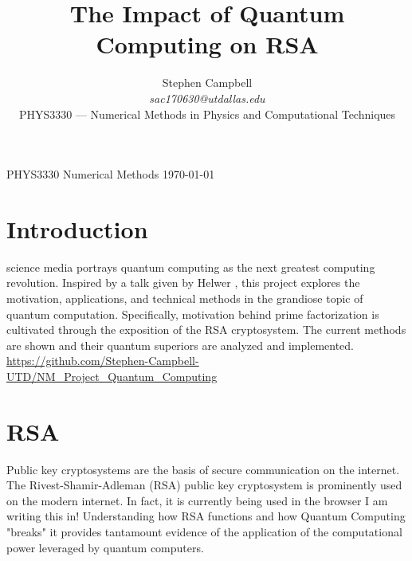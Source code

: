 \documentclass[journal]{IEEEtran}
\begin{document}
\newcommand{\eqdef}{\mathrel{:\mathop=}}

%


\title{The Impact of Quantum Computing on RSA}

\author{Stephen Campbell \\
    \emph{sac170630@utdallas.edu} \\
    PHYS3330 --- Numerical Methods in Physics and Computational Techniques
}

{PHYS3330 Numerical Methods \today}

\maketitle

\begin{abstract}
\end{abstract}

\section{Introduction}
 science media portrays quantum computing as the next
greatest computing revolution. Inspired by a talk given by Helwer
\cite{Helwer2018}, this project explores the motivation, applications, and
technical methods in the grandiose topic of quantum computation. Specifically,
motivation behind prime factorization is cultivated through the exposition of
the RSA cryptosystem. The current methods are shown and their quantum superiors
are analyzed and implemented. \url{https://github.com/Stephen-Campbell-UTD/NM_Project_Quantum_Computing}



\section{RSA}

Public key cryptosystems are the basis of secure communication on the internet.
The Rivest-Shamir-Adleman (RSA) \cite{Rivest1978} public key cryptosystem is prominently used on
the modern internet. In fact, it is currently being used in the browser I am
writing this in! Understanding how RSA functions and how Quantum Computing
"breaks" it provides tantamount evidence of the application of the computational
power leveraged by quantum computers.
\end{document}
